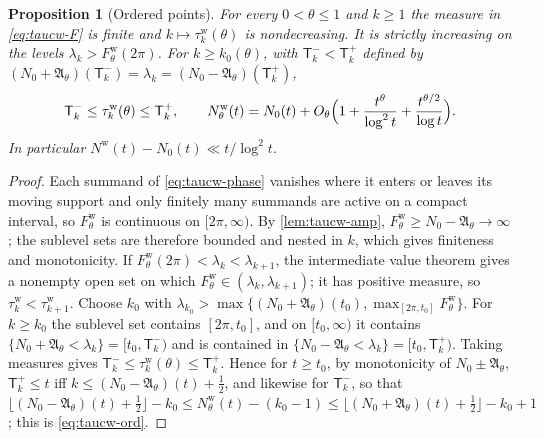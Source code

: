 \documentclass[11pt,a4paper]{article}
\numberwithin{equation}{section}
\newtheorem{proposition}[theorem]{Proposition}
\theoremstyle{definition}
\theoremstyle{remark}
\begin{document}
\begin{proposition}[Ordered points]\label{prop:taucw-ord}
For every $0<\theta\le1$ and $k\ge1$ the measure in \eqref{eq:taucw-F} is finite and $k\mapsto\tau^{\mathrm w}_k(\theta)$ is nondecreasing. It is strictly increasing on the levels $\lambda_k>F^{\mathrm w}_\theta(2\pi)$. For $k\ge k_0(\theta)$, with $\mathsf T_k^-<\mathsf T_k^+$ defined by $(N_0+\mathfrak A_\theta)(\mathsf T_k^-)=\lambda_k=(N_0-\mathfrak A_\theta)(\mathsf T_k^+)$,
\begin{equation}\label{eq:taucw-ord}
\mathsf T_k^-\le\tau_k^{\mathrm w}(\theta)\le\mathsf T_k^+,\qquad
N^{\mathrm w}_\theta(t)=N_0(t)+O_\theta\Bigl(1+\frac{t^\theta}{\log^2t}+\frac{t^{\theta/2}}{\log t}\Bigr).
\end{equation}
In particular $N^{\mathrm w}(t)-N_0(t)\ll t/\log^2t$.
\end{proposition}
\begin{proof}
Each summand of \eqref{eq:taucw-phase} vanishes where it enters or leaves its moving support and only finitely many summands are active on a compact interval, so $F^{\mathrm w}_\theta$ is continuous on $[2\pi,\infty)$. By \cref{lem:taucw-amp}, $F^{\mathrm w}_\theta\ge N_0-\mathfrak A_\theta\to\infty$; the sublevel sets are therefore bounded and nested in $k$, which gives finiteness and monotonicity. If $F^{\mathrm w}_\theta(2\pi)<\lambda_k<\lambda_{k+1}$, the intermediate value theorem gives a nonempty open set on which $F^{\mathrm w}_\theta\in(\lambda_k,\lambda_{k+1})$; it has positive measure, so $\tau_k^{\mathrm w}<\tau_{k+1}^{\mathrm w}$.
Choose $k_0$ with $\lambda_{k_0}>\max\{(N_0+\mathfrak A_\theta)(t_0),\max_{[2\pi,t_0]}F^{\mathrm w}_\theta\}$. For $k\ge k_0$ the sublevel set contains $[2\pi,t_0]$, and on $[t_0,\infty)$ it contains $\{N_0+\mathfrak A_\theta<\lambda_k\}=[t_0,\mathsf T_k^-)$ and is contained in $\{N_0-\mathfrak A_\theta<\lambda_k\}=[t_0,\mathsf T_k^+)$. Taking measures gives $\mathsf T_k^-\le\tau^{\mathrm w}_k(\theta)\le\mathsf T_k^+$. Hence for $t\ge t_0$, by monotonicity of $N_0\pm\mathfrak A_\theta$, $\mathsf T_k^+\le t$ iff $k\le(N_0-\mathfrak A_\theta)(t)+\frac12$, and likewise for $\mathsf T_k^-$, so that $\lfloor(N_0-\mathfrak A_\theta)(t)+\frac12\rfloor-k_0\le N^{\mathrm w}_\theta(t)-(k_0-1)\le\lfloor(N_0+\mathfrak A_\theta)(t)+\frac12\rfloor-k_0+1$; this is \eqref{eq:taucw-ord}.
\end{proof}
\end{document}
